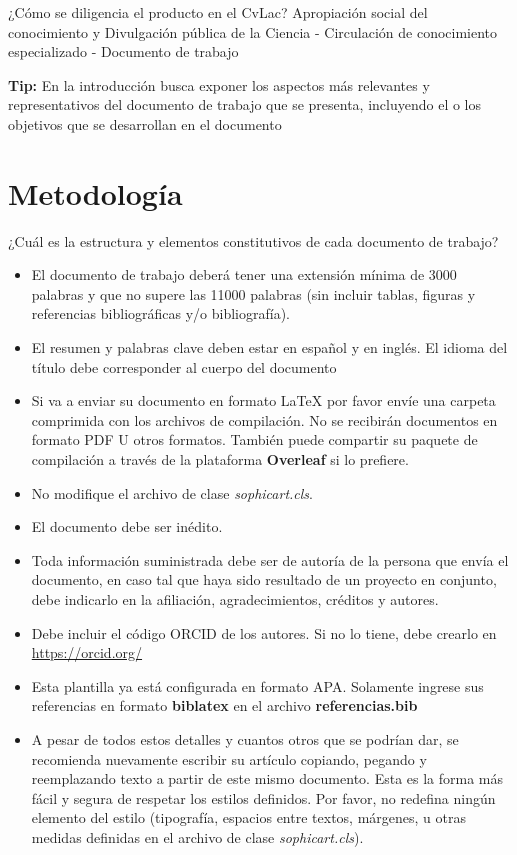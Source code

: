 \documentclass{sophicart}
\begin{document}
¿Cómo se diligencia el producto en el CvLac?
Apropiación social del conocimiento y Divulgación pública de la Ciencia - Circulación de conocimiento especializado - Documento de trabajo

\textbf{Tip:} En la introducción busca exponer los aspectos más relevantes y representativos del documento de trabajo que se presenta, incluyendo el o los objetivos que se desarrollan en el documento

\section{Metodología}

¿Cuál es la estructura y elementos constitutivos de cada documento de trabajo?

\begin{itemize}
  \item El documento de trabajo deberá tener una extensión mínima de 3000 palabras y que no supere las 11000 palabras (sin incluir tablas, figuras y referencias bibliográficas y/o bibliografía).
  \item El resumen y palabras clave deben estar en español y en inglés. El idioma del título debe corresponder al cuerpo del documento
  \item Si va a enviar su documento en formato \LaTeX\xspace  por favor envíe una carpeta comprimida con los archivos de compilación. No se recibirán documentos en formato PDF U otros formatos. También puede compartir su paquete de compilación a través de la plataforma \textbf{Overleaf} si lo prefiere.
  \item No modifique el archivo de clase \textit{sophicart.cls}.
  \item El documento debe ser inédito. 
  \item Toda información suministrada debe ser de autoría de la persona que envía el documento, en caso tal que haya sido resultado de un proyecto en conjunto, debe indicarlo en la afiliación, agradecimientos, créditos y autores. 
  \item Debe incluir el código ORCID de los autores. Si no lo tiene, debe crearlo en \url{https://orcid.org/}
  \item Esta plantilla ya está configurada en formato APA. Solamente ingrese sus referencias en formato \textbf{biblatex} en el archivo \textbf{referencias.bib}
  \item A pesar de todos estos detalles y cuantos otros que se podrían dar, se recomienda nuevamente escribir su artículo copiando, pegando y reemplazando texto a partir de este mismo documento. Esta es la forma más fácil y segura de respetar los estilos definidos. Por favor, no redefina ningún elemento del estilo (tipografía, espacios entre textos, márgenes, u otras medidas definidas en el archivo de clase \textit{sophicart.cls}).
  
\end{itemize}
\end{document}
